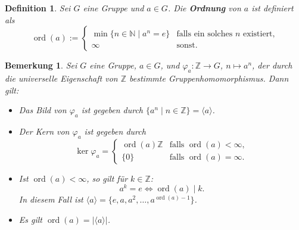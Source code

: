 \documentclass[a4paper, twoside, 11pt, ngerman]{report}
\newcommand{\NN}{\mathds N}
\newcommand{\ZZ}{\mathds Z}
\DeclareMathOperator{\ord}{ord}
\theoremstyle{definistyle}
\newtheorem{defini}[satz]{Definition}
\newtheorem{bem}[satz]{Bemerkung}
\theoremstyle{remark}
\newcommand{\defn}[1]{\textit{\bfseries #1}}
\begin{document}
\begin{defini}\label{def:ordnung_element}
Sei $G$ eine Gruppe und $a \in G$. Die \defn{Ordnung} von $a$ ist definiert als
\[
\ord(a) := 
\begin{cases}
\min \{ n \in \NN \mid a^n = e \} & \text{falls ein solches } n \text{ existiert,} \\
\infty & \text{sonst.}
\end{cases}
\]
\end{defini}

\begin{bem}\label{bem:ordnung_homomorphismus}
Sei $G$ eine Gruppe, $a \in G$, und $\varphi_a \colon \ZZ \to G$, $n \mapsto a^n$, der durch die universelle Eigenschaft von $\ZZ$ bestimmte Gruppenhomomorphismus. Dann gilt:
\begin{itemize}
    \item[(a)] Das Bild von $\varphi_a$ ist gegeben durch $\{a^n \mid n \in \ZZ\} = \langle a \rangle$.
    \item[(b)] Der Kern von $\varphi_a$ ist gegeben durch
    \[
    \ker \varphi_a = 
    \begin{cases}
    \ord(a) \ZZ & \text{falls } \ord(a) < \infty, \\
    \{0\} & \text{falls } \ord(a) = \infty.
    \end{cases}
    \]
    \item[(c)] Ist $\ord(a) < \infty$, so gilt für $k \in \ZZ$: 
    \[
    a^k = e \iff \ord(a) \mid k.
    \]
    In diesem Fall ist $\langle a \rangle = \{e, a, a^2, \dots, a^{\ord(a)-1} \}$.
    \item[(d)] Es gilt $\ord(a) = |\langle a \rangle|$.
\end{itemize}
\end{bem}
\end{document}
